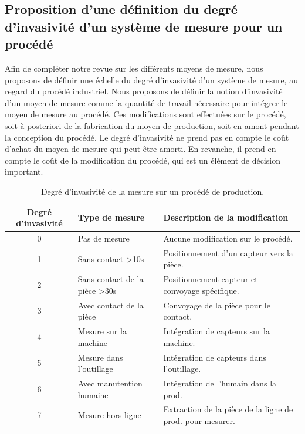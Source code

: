 \subsection{Proposition d'une définition du degré d'invasivité d'un système de mesure pour un procédé}
Afin de compléter notre revue sur les différents moyens de mesure, nous proposons de définir une échelle du degré d'invasivité d'un système de mesure, au regard du procédé industriel.
Nous proposons de définir la notion d'invasivité d'un moyen de mesure comme la quantité de travail nécessaire pour intégrer le moyen de mesure au procédé.
Ces modifications sont effectuées sur le procédé, soit à posteriori de la fabrication du moyen de production, soit en amont pendant la conception du procédé.
Le degré d'invasivité ne prend pas en compte le coût d'achat du moyen de mesure qui peut être amorti.
En revanche, il prend en compte le coût de la modification du procédé, qui est un élément de décision important.

\begin{table}[tbp]
	\hspace*{-5mm}
	\begin{tabular}{|c|l|l|}
		\arrayrulecolor{black}
		\hline
		Degré d'invasivité & Type de mesure & Description de la modification \\
		\hline \hline
		0 & Pas de mesure & Aucune modification sur le procédé. \\ \hline
		1 & Sans contact >10s & Positionnement d'un capteur vers la pièce. \\ \hline
		2 & Sans contact de la pièce >30s & Positionnement capteur et convoyage spécifique. \\ \hline
		3 & Avec contact de la pièce & Convoyage de la pièce pour le contact. \\ \hline
		4 & Mesure sur la machine & Intégration de capteurs sur la machine.  \\ \hline
		5 & Mesure dans l'outillage & Intégration de capteurs dans l'outillage. \\ \hline
		6 & Avec manutention humaine & Intégration de l'humain dans la prod. \\ \hline
		7 & Mesure hors-ligne & Extraction de la pièce de la ligne de prod. pour mesurer. \\ \hline
	\end{tabular}
	\caption{Degré d'invasivité de la mesure sur un procédé de production.}
	\label{tab:measure_invasivity}
\end{table}

